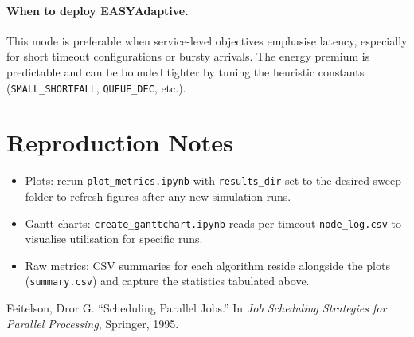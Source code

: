 \documentclass[11pt]{article}
\begin{document}
\paragraph{When to deploy EASYAdaptive.} This mode is preferable when service-level objectives emphasise latency, especially for short timeout configurations or bursty arrivals. The energy premium is predictable and can be bounded tighter by tuning the heuristic constants (\texttt{SMALL\_SHORTFALL}, \texttt{QUEUE\_DEC}, etc.).

\section{Reproduction Notes}
\begin{itemize}
  \item Plots: rerun \texttt{plot\_metrics.ipynb} with \texttt{results\_dir} set to the desired sweep folder to refresh figures after any new simulation runs.
  \item Gantt charts: \texttt{create\_ganttchart.ipynb} reads per-timeout \texttt{node\_log.csv} to visualise utilisation for specific runs.
  \item Raw metrics: CSV summaries for each algorithm reside alongside the plots (\texttt{summary.csv}) and capture the statistics tabulated above.
\end{itemize}

\begin{thebibliography}{1}
Feitelson, Dror G. ``Scheduling Parallel Jobs.'' In \emph{Job Scheduling Strategies for Parallel Processing}, Springer, 1995.
\end{thebibliography}
\end{document}
